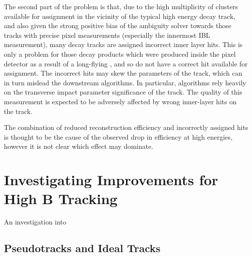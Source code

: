 
The second part of the problem is that, due to the high multiplicity of clusters available for assignment in the vicinity of the typical high energy \bhadron decay track, and also given the strong positive bias of the ambiguity solver towards those tracks with precise pixel measurements (especially the innermost IBL measurement), many \bhadron decay tracks are assigned incorrect inner layer hits.
This is only a problem for those decay products which were produced inside the pixel detector as a result of a long-flying \bhadron, and so do not have a correct hit available for assignment.
The incorrect hits may skew the parameters of the track, which can in turn mislead the downstream \btagging algorithms.
In particular, \btagging algorithms rely heavily on the transverse impact parameter significance \dzerosig of the track.
The quality of this measurement is expected to be adversely affected by wrong inner-layer hits on the track. 

The combination of reduced reconstruction efficiency and incorrectly assigned hits is thought to be the cause of the observed drop in \btagging efficiency at high energies, however it is not clear which effect may dominate.









\section{Investigating Improvements for High \texorpdfstring{\pT}{pT} B Tracking}\label{sec:b_track_reco_improvements}

An investigation into


\subsection{Pseudotracks and Ideal Tracks}\label{sec:pseudo ideal tracking}


